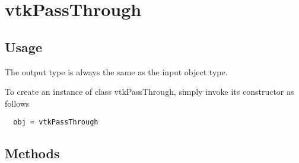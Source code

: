 \section{vtkPassThrough}

\subsection{Usage}

 The output type is always the same as the input object type.

To create an instance of class vtkPassThrough, simply
invoke its constructor as follows
\begin{verbatim}
  obj = vtkPassThrough
\end{verbatim}
\subsection{Methods}

